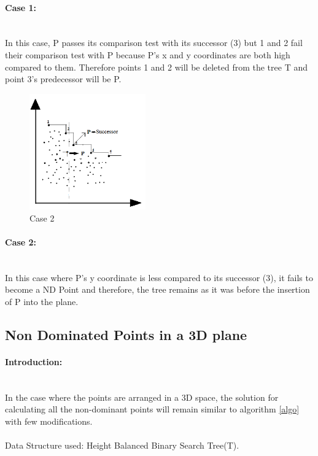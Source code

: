 \documentclass[pdftex,a4paper,12pt]{report}
\begin{document}
\paragraph{Case 1:} \makebox[2pt]{}\\
In this case, P passes its comparison test with its successor (3) but 1 and 2 fail their comparison test
with P because P’s x and y coordinates are both high compared to them. Therefore points 1 and 2 will be deleted
from the tree T and point 3’s predecessor will be P.\\
\begin{figure}[ht!]
\centering
\includegraphics[width=50mm]{p12.png}
\caption{Case 2}
\label{fig2}
\end{figure}
\paragraph{Case 2:} \makebox[2pt]{}\\
In this case where P's y coordinate is less compared to its successor (3), it fails to become a ND Point
and therefore, the tree remains as it was before the insertion of P into the plane.

\newpage
\subsection{Non Dominated Points in a 3D plane}
\paragraph{Introduction:} \makebox[2pt]{}\\
In the case where the points are arranged  in a 3D space, the solution
for calculating all the non-dominant points will remain similar to algorithm \ref{algo} with few modifications.\\\\
Data Structure used: Height Balanced Binary Search Tree(T).
\end{document}
